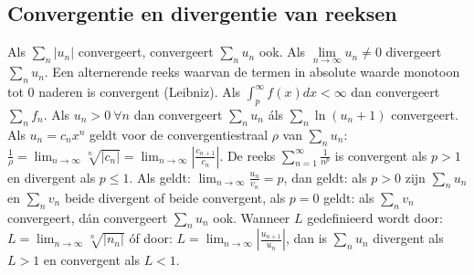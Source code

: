 \documentclass[twoside]{report}
\begin{document}
\subsection{Convergentie en divergentie van reeksen}
Als $\sum\limits_n|u_n|$ convergeert, convergeert $\sum\limits_n u_n$ ook.
\npar
Als $\lim\limits_{n\rightarrow\infty}u_n\neq0$ divergeert $\sum\limits_n u_n$.
\npar
Een alternerende reeks waarvan de termen in absolute waarde monotoon tot 0
naderen is convergent (Leibniz).
\npar
Als $\int_p^{\infty}f(x)dx<\infty$ dan convergeert $\sum\limits_n f_n$.
\npar
Als $u_n>0~\forall n$ dan convergeert $\sum\limits_n u_n$ \'als
$\sum\limits_n\ln(u_n+1)$ convergeert.
\npar
Als $u_n=c_nx^n$ geldt voor de convergentiestraal $\rho$ van
$\sum\limits_n u_n$:
$\displaystyle\frac{1}{\rho}=\lim_{n\rightarrow\infty}\sqrt[n]{|c_n|}=
\lim_{n\rightarrow\infty}\left|\frac{c_{n+1}}{c_n}\right|$.
\npar
De reeks $\displaystyle\sum_{n=1}^\infty \frac{1}{n^p}$ is convergent als
$p>1$ en divergent als $p\leq1$.
\npar
Als geldt:
$\displaystyle\lim_{n\rightarrow\infty}\frac{u_n}{v_n}=p$,
dan geldt: als $p>0$ zijn $\sum\limits_{n}u_n$ en $\sum\limits_{n}v_n$ beide
divergent of beide convergent, als $p=0$ geldt: als $\sum\limits_{n}v_n$
convergeert, d\'an convergeert $\sum\limits_{n}u_n$ ook.
\npar
Wanneer $L$ gedefinieerd wordt door:
$\displaystyle L=\lim_{n\rightarrow\infty}\sqrt[n]{|n_n|}$ \'of door:
$\displaystyle L=\lim_{n\rightarrow\infty}\left|\frac{u_{n+1}}{u_n}\right|$,
dan is $\sum\limits_{n}u_n$ divergent als $L>1$ en convergent als $L<1$.
\end{document}
